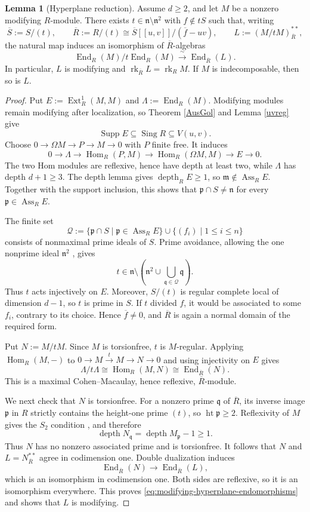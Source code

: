 \documentclass[a4paper,reqno]{amsart}
\def\m{\mathfrak{m}}
\def\n{\mathfrak{n}}
\def\p{\mathfrak{p}}
\def\La{\Lambda}
\DeclareMathOperator{\Hom}{Hom}
\DeclareMathOperator{\End}{End}
\DeclareMathOperator{\Ext}{Ext}
\DeclareMathOperator{\Ass}{Ass}
\DeclareMathOperator{\height}{ht}
\DeclareMathOperator{\rk}{rk}
\DeclareMathOperator{\depth}{depth}
\theoremstyle{definition}
\newtheorem{Lem}[Thm]{Lemma}
\begin{document}
\begin{Lem}[Hyperplane reduction]\label{modred}
Assume $d\ge2$, and let $M$ be a nonzero modifying $R$-module. There exists $t\in\n\setminus\n^2$ with $f\notin tS$ such that, writing
\[
\overline S:=S/(t),\qquad
\overline R:=R/(t)\cong\overline S[[u,v]]/(\overline f-uv),
\qquad L:=(M/tM)^{**}_{\overline R},
\]
the natural map induces an isomorphism of $\overline R$-algebras
\begin{equation}\label{eq:modifying-hyperplane-endomorphisms}
\End_R(M)/t\End_R(M)\xrightarrow{\ \sim\ }\End_{\overline R}(L).
\end{equation}
In particular, $L$ is modifying and $\rk_{\overline R}L=\rk_RM$. If $M$ is indecomposable, then so is $L$.
\end{Lem}
\begin{proof}
Put $E:=\Ext_R^1(M,M)$ and $\La:=\End_R(M)$. Modifying modules remain modifying after localization, so Theorem \ref{AusGol} and Lemma \ref{uvreg} give
\[
\operatorname{Supp}E\subseteq\operatorname{Sing}R\subseteq V(u,v).
\]
Choose $0\to\Omega M\to P\to M\to0$ with $P$ finite free. It induces
\[
0\longrightarrow\La\longrightarrow\Hom_R(P,M)
\longrightarrow\Hom_R(\Omega M,M)\longrightarrow E\longrightarrow0.
\]
The two Hom modules are reflexive, hence have depth at least two, while $\La$ has depth $d+1\ge3$. The depth lemma gives $\depth_RE\ge1$, so $\m\notin\Ass_RE$. Together with the support inclusion, this shows that $\p\cap S\ne\n$ for every $\p\in\Ass_RE$.

The finite set
\[
\mathcal Q:=\{\p\cap S\mid\p\in\Ass_RE\}
\cup\{(f_i)\mid1\le i\le n\}
\]
consists of nonmaximal prime ideals of $S$. Prime avoidance, allowing the one nonprime ideal $\n^2$ \cite[Tag 00DS]{stacks-project}, gives
\[
t\in\n\setminus\left(\n^2\cup\bigcup_{\mathfrak q\in\mathcal Q}\mathfrak q\right).
\]
Thus $t$ acts injectively on $E$. Moreover, $S/(t)$ is regular complete local of dimension $d-1$, so $t$ is prime in $S$. If $t$ divided $f$, it would be associated to some $f_i$, contrary to its choice. Hence $\overline f\ne0$, and $\overline R$ is again a normal domain of the required form.

Put $N:=M/tM$. Since $M$ is torsionfree, $t$ is $M$-regular. Applying $\Hom_R(M,-)$ to $0\to M\xrightarrow{t}M\to N\to0$ and using injectivity on $E$ gives
\[
\La/t\La\cong\Hom_R(M,N)\cong\End_{\overline R}(N).
\]
This is a maximal Cohen--Macaulay, hence reflexive, $\overline R$-module.

We next check that $N$ is torsionfree. For a nonzero prime $\mathfrak q$ of $\overline R$, its inverse image $\p$ in $R$ strictly contains the height-one prime $(t)$, so $\height\p\ge2$. Reflexivity of $M$ gives the $S_2$ condition \cite[Tag 0AVB]{stacks-project}, and therefore
\[
\depth N_{\mathfrak q}=\depth M_{\p}-1\ge1.
\]
Thus $N$ has no nonzero associated prime and is torsionfree. It follows that $N$ and $L=N^{**}_{\overline R}$ agree in codimension one. Double dualization induces
\[
\End_{\overline R}(N)\longrightarrow\End_{\overline R}(L),
\]
which is an isomorphism in codimension one. Both sides are reflexive, so it is an isomorphism everywhere. This proves \eqref{eq:modifying-hyperplane-endomorphisms} and shows that $L$ is modifying.


\end{proof}
\end{document}
